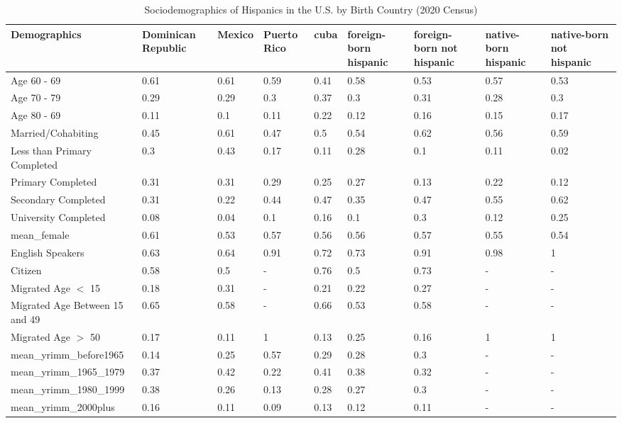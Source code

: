 \begin{table}[ht]
\centering
\caption{Sociodemographics of Hispanics in the U.S. by Birth Country (2020 Census)} 
\begingroup\small
\begin{tabular}{l|llllllll}
  \hline
Demographics & Dominican Republic & Mexico & Puerto Rico & cuba & foreign-born hispanic & foreign-born not hispanic & native-born hispanic & native-born not hispanic \\ 
  \hline
Age 60 - 69 & 0.61 & 0.61 & 0.59 & 0.41 & 0.58 & 0.53 & 0.57 & 0.53 \\ 
  Age 70 - 79 & 0.29 & 0.29 & 0.3 & 0.37 & 0.3 & 0.31 & 0.28 & 0.3 \\ 
  Age 80 - 69 & 0.11 & 0.1 & 0.11 & 0.22 & 0.12 & 0.16 & 0.15 & 0.17 \\ 
  Married/Cohabiting & 0.45 & 0.61 & 0.47 & 0.5 & 0.54 & 0.62 & 0.56 & 0.59 \\ 
  Less than Primary Completed & 0.3 & 0.43 & 0.17 & 0.11 & 0.28 & 0.1 & 0.11 & 0.02 \\ 
  Primary Completed & 0.31 & 0.31 & 0.29 & 0.25 & 0.27 & 0.13 & 0.22 & 0.12 \\ 
  Secondary Completed & 0.31 & 0.22 & 0.44 & 0.47 & 0.35 & 0.47 & 0.55 & 0.62 \\ 
  University Completed & 0.08 & 0.04 & 0.1 & 0.16 & 0.1 & 0.3 & 0.12 & 0.25 \\ 
  mean\_female & 0.61 & 0.53 & 0.57 & 0.56 & 0.56 & 0.57 & 0.55 & 0.54 \\ 
  English Speakers & 0.63 & 0.64 & 0.91 & 0.72 & 0.73 & 0.91 & 0.98 & 1 \\ 
  Citizen & 0.58 & 0.5 & - & 0.76 & 0.5 & 0.73 & - & - \\ 
  Migrated Age $<$ 15 & 0.18 & 0.31 & - & 0.21 & 0.22 & 0.27 & - & - \\ 
  Migrated Age Between 15 and 49 & 0.65 & 0.58 & - & 0.66 & 0.53 & 0.58 & - & - \\ 
  Migrated Age $>$ 50 & 0.17 & 0.11 & 1 & 0.13 & 0.25 & 0.16 & 1 & 1 \\ 
  mean\_yrimm\_before1965 & 0.14 & 0.25 & 0.57 & 0.29 & 0.28 & 0.3 & - & - \\ 
  mean\_yrimm\_1965\_1979 & 0.37 & 0.42 & 0.22 & 0.41 & 0.38 & 0.32 & - & - \\ 
  mean\_yrimm\_1980\_1999 & 0.38 & 0.26 & 0.13 & 0.28 & 0.27 & 0.3 & - & - \\ 
  mean\_yrimm\_2000plus & 0.16 & 0.11 & 0.09 & 0.13 & 0.12 & 0.11 & - & - \\ 
   \hline
\end{tabular}
\endgroup
\end{table}
